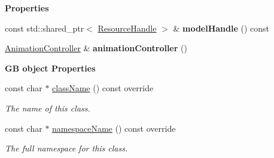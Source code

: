 \begin{Indent}\textbf{ Properties}\par
\begin{DoxyCompactItemize}
\item 
\mbox{\label{classrev_1_1_bone_animation_component_ae46752102e3449e5b10ea68f87af0eb1}} 
const std\+::shared\+\_\+ptr$<$ \mbox{\hyperlink{classrev_1_1_resource_handle}{Resource\+Handle}} $>$ \& {\bfseries model\+Handle} () const
\item 
\mbox{\label{classrev_1_1_bone_animation_component_a4bf58c37051692cbfe18c696b6187c97}} 
\mbox{\hyperlink{classrev_1_1_animation_controller}{Animation\+Controller}} \& {\bfseries animation\+Controller} ()
\end{DoxyCompactItemize}
\end{Indent}
\begin{Indent}\textbf{ GB object Properties}\par
\begin{DoxyCompactItemize}
\item 
const char $\ast$ \mbox{\hyperlink{classrev_1_1_bone_animation_component_a3eaa61a98c682a9b0f5aa804b448380b}{class\+Name}} () const override
\begin{DoxyCompactList}\small\item\em The name of this class. \end{DoxyCompactList}\item 
const char $\ast$ \mbox{\hyperlink{classrev_1_1_bone_animation_component_af7df4b639ac2c3e9048f44c159d0dcda}{namespace\+Name}} () const override
\begin{DoxyCompactList}\small\item\em The full namespace for this class. \end{DoxyCompactList}\end{DoxyCompactItemize}
\end{Indent}
